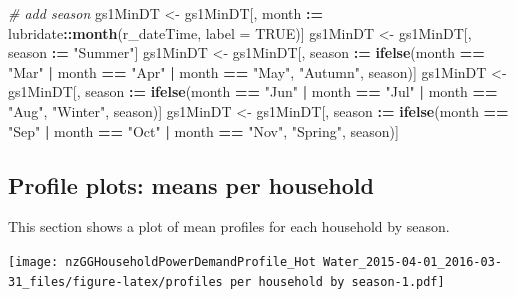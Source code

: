 \documentclass[]{article}
\newenvironment{Shaded}{\begin{snugshade}}{\end{snugshade}}
\newcommand{\KeywordTok}[1]{\textcolor[rgb]{0.13,0.29,0.53}{\textbf{#1}}}
\newcommand{\DataTypeTok}[1]{\textcolor[rgb]{0.13,0.29,0.53}{#1}}
\newcommand{\StringTok}[1]{\textcolor[rgb]{0.31,0.60,0.02}{#1}}
\newcommand{\CommentTok}[1]{\textcolor[rgb]{0.56,0.35,0.01}{\textit{#1}}}
\newcommand{\OtherTok}[1]{\textcolor[rgb]{0.56,0.35,0.01}{#1}}
\newcommand{\OperatorTok}[1]{\textcolor[rgb]{0.81,0.36,0.00}{\textbf{#1}}}
\newcommand{\ErrorTok}[1]{\textcolor[rgb]{0.64,0.00,0.00}{\textbf{#1}}}
\newcommand{\NormalTok}[1]{#1}
\begin{document}
\begin{Shaded}
\begin{Highlighting}[]
\CommentTok{# add season}
\NormalTok{gs1MinDT <-}\StringTok{ }\NormalTok{gs1MinDT[, month }\OperatorTok{:}\ErrorTok{=}\StringTok{ }\NormalTok{lubridate}\OperatorTok{::}\KeywordTok{month}\NormalTok{(r_dateTime, }\DataTypeTok{label =} \OtherTok{TRUE}\NormalTok{)]}
\NormalTok{gs1MinDT <-}\StringTok{ }\NormalTok{gs1MinDT[, season }\OperatorTok{:}\ErrorTok{=}\StringTok{ "Summer"}\NormalTok{]}
\NormalTok{gs1MinDT <-}\StringTok{ }\NormalTok{gs1MinDT[, season }\OperatorTok{:}\ErrorTok{=}\StringTok{ }\KeywordTok{ifelse}\NormalTok{(month }\OperatorTok{==}\StringTok{ "Mar"} \OperatorTok{|}
\StringTok{                                              }\NormalTok{month }\OperatorTok{==}\StringTok{ "Apr"} \OperatorTok{|}
\StringTok{                                              }\NormalTok{month }\OperatorTok{==}\StringTok{ "May"}\NormalTok{, }\StringTok{"Autumn"}\NormalTok{, season)]}
\NormalTok{gs1MinDT <-}\StringTok{ }\NormalTok{gs1MinDT[, season }\OperatorTok{:}\ErrorTok{=}\StringTok{ }\KeywordTok{ifelse}\NormalTok{(month }\OperatorTok{==}\StringTok{ "Jun"} \OperatorTok{|}
\StringTok{                                              }\NormalTok{month }\OperatorTok{==}\StringTok{ "Jul"} \OperatorTok{|}
\StringTok{                                              }\NormalTok{month }\OperatorTok{==}\StringTok{ "Aug"}\NormalTok{, }\StringTok{"Winter"}\NormalTok{, season)]}
\NormalTok{gs1MinDT <-}\StringTok{ }\NormalTok{gs1MinDT[, season }\OperatorTok{:}\ErrorTok{=}\StringTok{ }\KeywordTok{ifelse}\NormalTok{(month }\OperatorTok{==}\StringTok{ "Sep"} \OperatorTok{|}
\StringTok{                                              }\NormalTok{month }\OperatorTok{==}\StringTok{ "Oct"} \OperatorTok{|}
\StringTok{                                              }\NormalTok{month }\OperatorTok{==}\StringTok{ "Nov"}\NormalTok{, }\StringTok{"Spring"}\NormalTok{, season)]}
\end{Highlighting}
\end{Shaded}

\subsection{Profile plots: means per
household}\label{profile-plots-means-per-household}

This section shows a plot of mean profiles for each household by season.

\texttt{[image: nzGGHouseholdPowerDemandProfile\_Hot Water\_2015-04-01\_2016-03-31\_files/figure-latex/profiles per household by season-1.pdf]}
\end{document}
